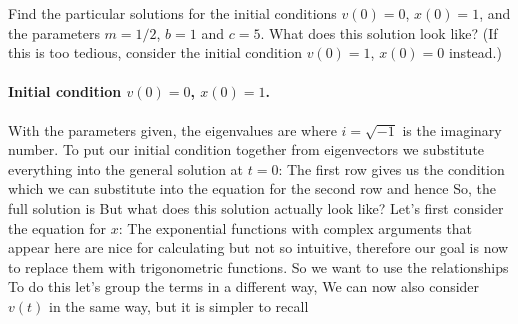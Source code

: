\subquestion 
Find the particular solutions for the initial conditions $v(0)=0$, $x(0)=1$,
and the parameters $m=1/2$, $b=1$ and $c=5$. What does this solution look like? (If this is too tedious, consider the initial condition $v(0)=1$, $x(0)=0$ instead.)

\solution 
\paragraph{Initial condition $v(0)=0$, $x(0)=1$.}With the parameters given, the eigenvalues are 
where $i=\sqrt{-1}$ is the imaginary number. To put our initial condition together from eigenvectors we substitute everything into the general solution at $t=0$:
The first row gives us the condition 
which we can substitute into the equation for the second row
and hence
So, the full solution is 
But what does this solution actually look like? Let's first consider the equation for $x$:
The exponential functions with complex arguments that appear here are nice for calculating but not so intuitive, therefore our goal is now to replace them with trigonometric functions. So we want to use the relationships
To do this let's group the terms in a different way, 
We can now also consider $v(t)$ in the same way, but it is simpler to recall

